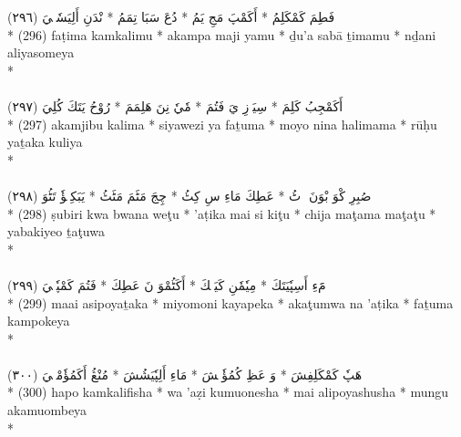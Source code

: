 \documentclass[a4paper, 12pt]{report}
\begin{document}
\begin{center}
\textarabic{(٢٩٦) \textcolor{mygreen}{فَطِمَ كَمْكَلِمُ  * أَكَمْپَ مَجِ يَمُ  * دُعَ سَبَا تِمَمُ  * نْدَنِ أَلِيَسٗمٖيَ }} \\* 
(296) faṭima kamkalimu  * akampa maji yamu  * ḏu'a sabā ṯimamu  * nḏani aliyasomeya  \\* 
 \\ 
\\[8mm] 

\textarabic{(٢٩٧) \textcolor{mygreen}{أَكَمْجِبُ كَلِمَ  * سِيَوٖزِ يَ فَتُمَ  * مٗيٗ نِنَ هَلِمَمَ  * رُوْحُ يَتَكَ كُلِيَ }} \\* 
(297) akamjibu kalima  * siyawezi ya faṯuma  * moyo nina halimama  * rūḥu yaṯaka kuliya  \\* 
 \\ 
\\[8mm] 

\textarabic{(٢٩٨) \textcolor{mygreen}{صُبِرِ كْوَ بْوَنَ وٖٹُ  * عَطِكَ مَاءِ سِ كِٹُ  * چِجَ مَٹَمَ مَٹَٹُ  * يَبَكِيٖؤٗ تَٹُوَ }} \\* 
(298) ṣubiri kwa bwana weţu  * 'aṭika mai si kiţu  * chija maţama maţaţu  * yabakiyeo ṯaţuwa  \\* 
 \\ 
\\[8mm] 

\textarabic{(٢٩٩) \textcolor{mygreen}{مََءِ أَسِپٗيَتَكَ  * مِيٗمٗنِ كَيَپٖكَ  * أَكَٹُمْوَ نَ عَطِكَ  * فَتُمَ كَمْپٗكٖيَ }} \\* 
(299) maai asipoyaṯaka  * miyomoni kayapeka  * akaţumwa na 'aṭika  * faṯuma kampokeya  \\* 
 \\ 
\\[8mm] 

\textarabic{(٣٠٠) \textcolor{mygreen}{هَپٗ كَمْكَلِفِشَ  * وَ عَظِ كُمُؤٗنٖشَ  * مَاءِ أَلِپٗيَشُشَ  * مُنْڠُ أَكَمُؤٗمْبٖيَ }} \\* 
(300) hapo kamkalifisha  * wa 'aẓi kumuonesha  * mai alipoyashusha  * mungu akamuombeya  \\* 
 \\ 
\\[8mm] 


\end{center}
\end{document}
